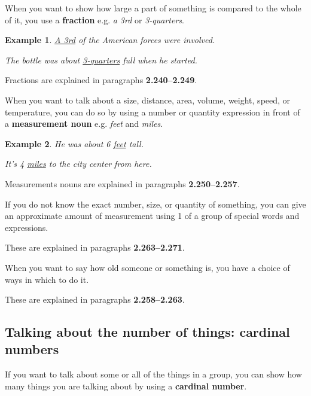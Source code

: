 \documentclass[oneside]{book}
\numberwithin{equation}{section}
\newtheorem{example}{Example}[section]
\begin{document}
%
\noindent{} When you want to show how large a part of something is compared to the whole of it, you use a \textbf{fraction} e.g. \textit{a 3rd} or \textit{3-quarters}.
\begin{example}
    \underline{A 3rd} of the American forces were involved.
    
    The bottle was about \underline{3-quarters} full when he started.
\end{example}
Fractions are explained in paragraphs \textbf{2.240--2.249}.

%
\noindent{} When you want to talk about a size, distance, area, volume, weight, speed, or temperature, you can do so by using a number or quantity expression in front of a \textbf{measurement noun} e.g. \textit{feet} and \textit{miles}.
\begin{example}
    He was about 6 \underline{feet} tall.
    
    It's 4 \underline{miles} to the city center from here.
\end{example}
Measurements nouns are explained in paragraphs \textbf{2.250--2.257}.

%
If you do not know the exact number, size, or quantity of something, you can give an approximate amount of measurement using 1 of a group of special words and expressions.

These are explained in paragraphs \textbf{2.263--2.271}.

%
\noindent{} When you want to say how old someone or something is, you have a choice of ways in which to do it.

These are explained in paragraphs \textbf{2.258--2.263}.

\subsection{Talking about the number of things: cardinal numbers}
\noindent{} If you want to talk about some or all of the things in a group, you can show how many things you are talking about by using a \textbf{cardinal number}.
\end{document}
